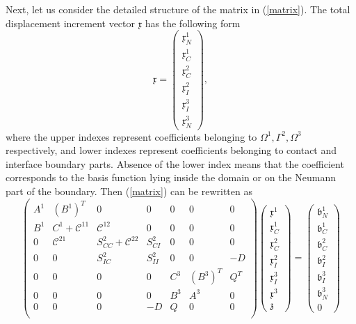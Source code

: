 Next, let us consider the detailed structure of the matrix in (\ref{matrix}). The total displacement increment vector $\mathfrak x$ has the following form
\begin{equation*}
\mathfrak x = 
\left( 
\begin{array}{c}
\mathfrak x^1_N \\
\mathfrak x^1_C \\
\mathfrak x^2_C \\
\mathfrak x^2_I \\
\mathfrak x^3_I \\
\mathfrak x^3_N
\end{array}
\right),
\end{equation*}
where the upper indexes represent coefficients belonging to $\Omega^1, \Gamma^2, \Omega^3$ respectively, and lower indexes represent coefficients belonging to contact and interface boundary parts. Absence of the lower index means that the coefficient corresponds to the basis function lying inside the domain or on the Neumann part of the boundary. Then (\ref{matrix}) can be rewritten as
\begin{equation*}
\left( 
\begin{array}{ccccccc}
A^1 & (B^1)^T        & 0                   & 0        & 0   & 0       & 0  \\
B^1 & C^1 + {\mathcal C}^{11} &  {\mathcal C}^{12}           & 0        & 0   & 0       & 0  \\
0   & {\mathcal C}^{21}       & S^2_{CC} + {\mathcal C}^{22} & S^2_{CI} & 0   & 0       & 0  \\
0   & 0              & S^2_{IC}            & S^2_{II} & 0   & 0       & -D \\
0   & 0              & 0                   & 0        & C^3 & (B^3)^T & Q^T\\
0   & 0              & 0                   & 0        & B^3 & A^3     & 0  \\
0   & 0              & 0                   & -D       & Q   & 0       & 0  \\
\end{array}
\right) 
\left( 
\begin{array}{c}
\mathfrak x^1   \\
\mathfrak x^1_C \\
\mathfrak x^2_C \\
\mathfrak x^2_I \\
\mathfrak x^3_I \\
\mathfrak x^3   \\
\mathfrak z
\end{array}
\right) 
=
\left( 
\begin{array}{c}
\mathfrak b^1_N \\
\mathfrak b^1_C \\
\mathfrak b^2_C \\
\mathfrak b^2_I \\
\mathfrak b^3_I \\
\mathfrak b^3_N \\
0
\end{array}
\right)
\end{equation*}
